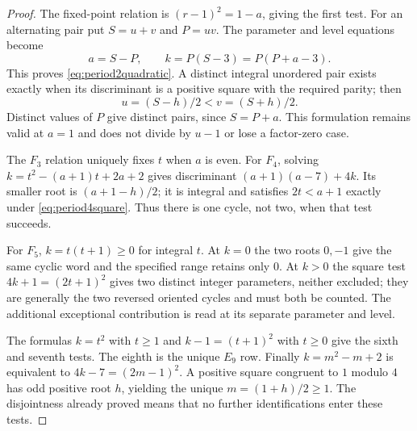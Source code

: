 \begin{proof}
The fixed-point relation is $(r-1)^2=1-a$, giving the
first test. For an alternating pair put $S=u+v$ and
$P=uv$. The parameter and level equations become
\[
 a=S-P,\qquad k=P(S-3)=P(P+a-3).
\]
This proves \eqref{eq:period2quadratic}. A distinct integral
unordered pair exists exactly when its discriminant is a
positive square with the required parity; then
\[
 u=(S-h)/2<v=(S+h)/2.
\]
Distinct values of $P$ give distinct pairs, since $S=P+a$.
This formulation remains valid at $a=1$ and does not divide
by $u-1$ or lose a factor-zero case.

The $F_3$ relation uniquely fixes $t$ when $a$ is even.
For $F_4$, solving
$k=t^2-(a+1)t+2a+2$ gives discriminant
$(a+1)(a-7)+4k$. Its smaller root is
$(a+1-h)/2$; it is integral and satisfies $2t<a+1$
exactly under \eqref{eq:period4square}. Thus there is
one cycle, not two, when that test succeeds.

For $F_5$, $k=t(t+1)\ge0$ for integral $t$.
At $k=0$ the two roots $0,-1$ give the same cyclic
word and the specified range retains only $0$. At $k>0$
the square test $4k+1=(2t+1)^2$ gives two distinct
integer parameters, neither excluded; they are generally
the two reversed oriented cycles and must both be counted.
The additional exceptional contribution is read at its
separate parameter and level.

The formulas $k=t^2$ with $t\ge1$ and
$k-1=(t+1)^2$ with $t\ge0$ give the sixth and
seventh tests. The eighth is the unique $E_9$ row.
Finally $k=m^2-m+2$ is equivalent to
$4k-7=(2m-1)^2$. A positive square congruent to $1$
modulo $4$ has odd positive root $h$, yielding the unique
$m=(1+h)/2\ge1$. The disjointness already proved means
that no further identifications enter these tests.
\end{proof}

